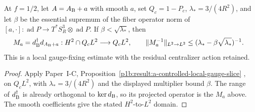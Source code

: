 \documentclass[11pt,a4paper]{article}
\begin{document}
\begin{proposition}
\label{p3f:prop:m8td-local-gauge-inverse}
At $f=1/2$, let $A=A_{\rm B}+a$ with smooth $a$, set $Q_c=1-P_c$,
$\lambda_*=3/(4R^2)$, and let $\beta$ be the essential supremum of the
fiber operator norm of $[a,\cdot]:\operatorname{ad}P\to
T^*S_R^3\otimes\operatorname{ad}P$. If $\beta<\sqrt{\lambda_*}$, then
\begin{equation}
 M_a=d_{\rm B}^\dagger d_{A_{\rm B}+a}:H^2\cap Q_cL^2\longrightarrow Q_cL^2,
 \qquad \|M_a^{-1}\|_{L^2\to L^2}
 \le(\lambda_*-\beta\sqrt{\lambda_*})^{-1}.
 \label{p3f:eq:m8td-gauge-inverse-bound}
\end{equation}
This is a local gauge-fixing estimate with the residual centralizer action
retained.
\end{proposition}
\begin{proof}
Apply Paper~I-C,
Proposition~\ref{p1b:result:a-controlled-local-gauge-slice}
\cite{Kugelmann2026Paper1C}, on \(Q_cL^2\), with
\(\lambda_*=3/(4R^2)\) and the displayed multiplier bound \(\beta\).
The range of \(d_{\rm B}^\dagger\) is already orthogonal to
\(\ker d_{\rm B}\), so its projected operator is the \(M_a\) above.
The smooth coefficients give the stated \(H^2\)-to-\(L^2\) domain.
\end{proof}
\end{document}
